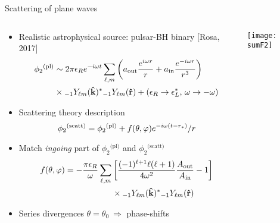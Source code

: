 \documentclass[9pt]{beamer}
\newcommand{\uu}[3][]{ {}_{#1} #2_{#3} }
\begin{document}
{
\begin{frame}[fragile]{Scattering of plane waves}
	\begin{columns}[T]      
		\begin{column}{0.6\textwidth}
			\begin{itemize}
				\setlength\itemsep{1em}
				\item Realistic astrophysical source: pulsar-BH binary [Rosa, 2017]
				\begin{align*}
					\phi_2{}^\text{(pl)} &\sim 2 \pi \epsilon_R e^{-i \omega t} \sum_{\ell,m} \left(
						a_\mathrm{out} \frac{e^{i \omega r}}{r} 
						+ a_\mathrm{in} \frac{e^{-i \omega r}}{r^3} \right) \\
						&\hspace*{0cm}\times \uu[-1]{Y}{\ell m}(\mathbf{\hat{k}})^{*} \uu[-1]{Y}{\ell m}(\mathbf{\hat{r}})
						+ (\epsilon_R \to \epsilon_L^*, \,\omega \to -\omega )
				\end{align*}

				\item Scattering theory description 
				$$ \displaystyle \phi_2{}^\text{(scatt)} =  \phi_2{}^\text{(pl)} + f(\theta,\varphi) e^{- i \omega ( t - r_* )} /r \vspace{0.1cm}$$

				\item Match \emph{ingoing} part of $\phi_2{}^\text{(pl)}$ and $\phi_2{}^\text{(scatt)}$
				\begin{align*}
					f(\theta,\varphi) &= - \frac{\pi \epsilon_R}{\omega} \sum_{\ell,m} \left[\frac{(-1)^{\ell+1} \ell(\ell+1)}{4 \omega^2 }
					\frac{A_\mathrm{out}}{A_\mathrm{in}} - 1 \right] \\
					& \hspace*{2cm}\times \uu[-1]{Y}{\ell m}(\mathbf{\hat{k}})^{*} \uu[-1]{Y}{\ell m}(\mathbf{\hat{r}})
				\end{align*}

				\item Series divergences $\theta=\theta_0 ~\Rightarrow$ \alert{phase-shifts}
			\end{itemize}
			\vfill
		\end{column}
		\begin{column}{0.4\textwidth}
			\vspace{4.75cm}
			\texttt{[image: sumF2]}
		\end{column}
	\end{columns}
\end{frame}
}
\end{document}
